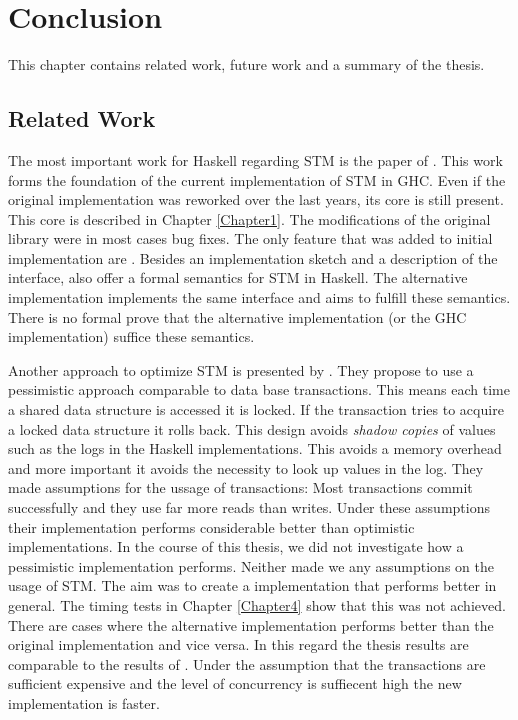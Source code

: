\chapter{Conclusion}

\label{Chapter5}

This chapter contains related work, future work and a summary of the thesis.

\section{Related Work}
The most important work for Haskell regarding STM is the paper of \parencite{STMBase}. This work forms the foundation 
of the current implementation of STM in GHC. Even if the original implementation was reworked over the 
last years, its core is still present. This core is described in Chapter \ref{Chapter1}. The modifications
of the original library were in most cases bug fixes. The only feature that was added to initial
implementation are  \parencite{invariants}. Besides an implementation sketch
and a description of the interface, \parencite{STMBase} also offer a formal semantics for STM in Haskell.
The alternative implementation implements the same interface and aims to fulfill these
semantics. There is no formal prove that the alternative implementation (or the GHC implementation) 
suffice these semantics. 

Another approach to optimize STM is presented by \parencite{pessimisticSTM}. They propose to 
use a pessimistic approach comparable to data base transactions. This means each time a shared data structure 
is accessed it is locked. If the transaction tries to acquire a locked data structure it rolls back. 
This design avoids \textit{shadow copies} of values such as the logs in the Haskell implementations. This avoids 
a memory overhead and more important it avoids the necessity to look up values in the log. They made 
assumptions for the ussage of transactions: Most transactions commit successfully and they use far more reads
than writes. Under these assumptions their implementation performs considerable better than optimistic 
implementations. In the course of this thesis, we did not investigate how a pessimistic implementation 
performs. Neither made we any assumptions on the usage of STM. The aim was to create a implementation
that performs better in general. The timing tests in Chapter \ref{Chapter4} show that this was not achieved. 
There are cases where the alternative implementation performs better than the original implementation
and vice versa. In this regard the thesis results are comparable to the results of \parencite{pessimisticSTM}. 
Under the assumption that the transactions are sufficient expensive and the level of concurrency is 
suffiecent high the new implementation is faster. 

